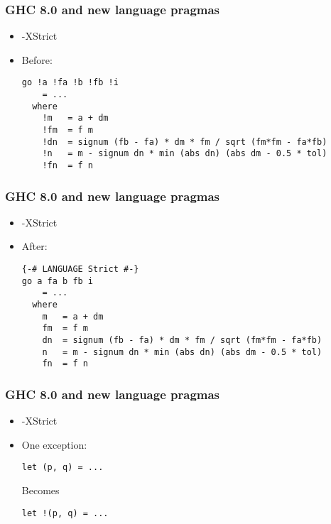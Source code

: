 \documentclass{beamer}
\begin{document}
\begin{frame}[fragile]
    \frametitle{GHC 8.0 and new language pragmas}

    \begin{itemize}
        \item -XStrict
        \item Before: \\
            \begin{verbatim}
go !a !fa !b !fb !i
    = ...
  where
    !m   = a + dm
    !fm  = f m
    !dn  = signum (fb - fa) * dm * fm / sqrt (fm*fm - fa*fb)
    !n   = m - signum dn * min (abs dn) (abs dm - 0.5 * tol)
    !fn  = f n
            \end{verbatim}
    \end{itemize}
\end{frame}

\begin{frame}[fragile]
    \frametitle{GHC 8.0 and new language pragmas}

    \begin{itemize}
        \item -XStrict
        \item After: \\
            \begin{verbatim}
{-# LANGUAGE Strict #-}
go a fa b fb i
    = ...
  where
    m   = a + dm
    fm  = f m
    dn  = signum (fb - fa) * dm * fm / sqrt (fm*fm - fa*fb)
    n   = m - signum dn * min (abs dn) (abs dm - 0.5 * tol)
    fn  = f n
            \end{verbatim}
    \end{itemize}
\end{frame}

\begin{frame}[fragile]
    \frametitle{GHC 8.0 and new language pragmas}

    \begin{itemize}
        \item -XStrict
        \item
            One exception: \\
            \begin{verbatim}
let (p, q) = ...
            \end{verbatim}

            Becomes \\

            \begin{verbatim}
let !(p, q) = ...
            \end{verbatim}
    \end{itemize}
\end{frame}
\end{document}
